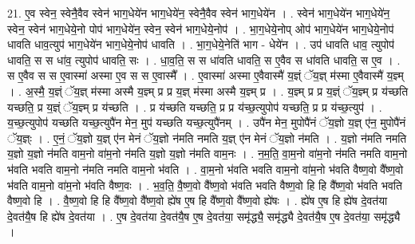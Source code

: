 \documentclass[17pt]{extarticle}
\begin{document}
21. ए॒व स्वेन॒ स्वेनै॒वैव स्वेन॑ भाग॒धेये॑न भाग॒धेये॑न॒ स्वेनै॒वैव स्वेन॑ भाग॒धेये॑न । . स्वेन॑ भाग॒धेये॑न भाग॒धेये॑न॒ स्वेन॒ स्वेन॑ भाग॒धेये॒नो पोप॑ भाग॒धेये॑न॒ स्वेन॒ स्वेन॑ भाग॒धेये॒नोप॑ । . भा॒ग॒धेये॒नोप् ओप॑ भाग॒धेये॑न भाग॒धेये॒नोप॑ धावति धाव॒त्युप॑ भाग॒धेये॑न भाग॒धेये॒नोप॑ धावति । . भा॒ग॒धेये॒नेति॑ भाग - धेये॑न । . उप॑ धावति धाव॒ त्युपोप॑ धावति॒ स स धा॑व॒ त्युपोप॑ धावति॒ सः । . धा॒व॒ति॒ स स धा॑वति धावति॒ स ए॒वैव स धा॑वति धावति॒ स ए॒व । . स ए॒वैव स स ए॒वास्मा॑ अस्मा ए॒व स स ए॒वास्मै᳚ । . ए॒वास्मा॑ अस्मा ए॒वैवास्मै॑ य॒ज्ञ्ं ॅय॒ज्ञ् म॑स्मा ए॒वैवास्मै॑ य॒ज्ञ्म् । . अ॒स्मै॒ य॒ज्ञ्ं ॅय॒ज्ञ् म॑स्मा अस्मै य॒ज्ञ्म् प्र प्र य॒ज्ञ् म॑स्मा अस्मै य॒ज्ञ्म् प्र । . य॒ज्ञ्म् प्र प्र य॒ज्ञ्ं ॅय॒ज्ञ्म् प्र य॑च्छति यच्छति॒ प्र य॒ज्ञ्ं ॅय॒ज्ञ्म् प्र य॑च्छति । . प्र य॑च्छति यच्छति॒ प्र प्र य॑च्छ॒त्युपोप॑ यच्छति॒ प्र प्र य॑च्छ॒त्युप॑ । . य॒च्छ॒त्युपोप॑ यच्छति यच्छ॒त्युपै॑न मेन॒ मुप॑ यच्छति यच्छ॒त्युपै॑नम् । . उपै॑न मेन॒ मुपोपै॑नं ॅय॒ज्ञो य॒ज्ञ् ए॑न॒ मुपोपै॑नं ॅय॒ज्ञ्ः । . ए॒नं॒ ॅय॒ज्ञो य॒ज्ञ् ए॑न मेनं ॅय॒ज्ञो न॑मति नमति य॒ज्ञ् ए॑न मेनं ॅय॒ज्ञो न॑मति । . य॒ज्ञो न॑मति नमति य॒ज्ञो य॒ज्ञो न॑मति वाम॒नो वा॑म॒नो न॑मति य॒ज्ञो य॒ज्ञो न॑मति वाम॒नः । . न॒म॒ति॒ वा॒म॒नो वा॑म॒नो न॑मति नमति वाम॒नो भ॑वति भवति वाम॒नो न॑मति नमति वाम॒नो भ॑वति । . वा॒म॒नो भ॑वति भवति वाम॒नो वा॑म॒नो भ॑वति वैष्ण॒वो वै᳚ष्ण॒वो भ॑वति वाम॒नो वा॑म॒नो भ॑वति वैष्ण॒वः । . भ॒व॒ति॒ वै॒ष्ण॒वो वै᳚ष्ण॒वो भ॑वति भवति वैष्ण॒वो हि हि वै᳚ष्ण॒वो भ॑वति भवति वैष्ण॒वो हि । . वै॒ष्ण॒वो हि हि वै᳚ष्ण॒वो वै᳚ष्ण॒वो ह्ये॑ष ए॒ष हि वै᳚ष्ण॒वो वै᳚ष्ण॒वो ह्ये॑षः । . ह्ये॑ष ए॒ष हि ह्ये॑ष दे॒वत॑या दे॒वत॑यै॒ष हि ह्ये॑ष दे॒वत॑या । . ए॒ष दे॒वत॑या दे॒वत॑यै॒ष ए॒ष दे॒वत॑या॒ समृ॑द्ध्यै॒ समृ॑द्ध्यै दे॒वत॑यै॒ष ए॒ष दे॒वत॑या॒ समृ॑द्ध्यै । \newline
\end{document}
